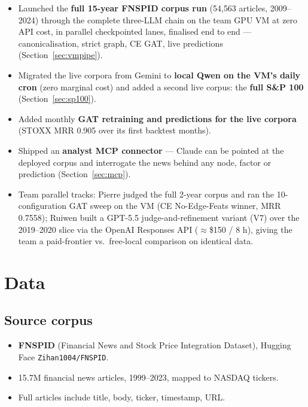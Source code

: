 \documentclass[11pt]{article}
\begin{document}
\begin{itemize}
  \item Launched the \textbf{full 15-year FNSPID corpus run} (54{,}563 articles, 2009--2024) through the complete three-LLM chain on the team GPU VM at zero API cost, in parallel checkpointed lanes, finalised end to end --- canonicalisation, strict graph, CE GAT, live predictions (Section~\ref{sec:vmpipe}).
  \item Migrated the live corpora from Gemini to \textbf{local Qwen on the VM's daily cron} (zero marginal cost) and added a second live corpus: the \textbf{full S\&P 100} (Section~\ref{sec:sp100}).
  \item Added monthly \textbf{GAT retraining and predictions for the live corpora} (STOXX MRR 0.905 over its first backtest months).
  \item Shipped an \textbf{analyst MCP connector} --- Claude can be pointed at the deployed corpus and interrogate the news behind any node, factor or prediction (Section~\ref{sec:mcp}).
  \item Team parallel tracks: Pierre judged the full 2-year corpus and ran the 10-configuration GAT sweep on the VM (CE No-Edge-Feats winner, MRR 0.7558); Ruiwen built a GPT-5.5 judge-and-refinement variant (V7) over the 2019--2020 slice via the OpenAI Responses API (\(\approx\)\$150 / 8 h), giving the team a paid-frontier vs.\ free-local comparison on identical data.
\end{itemize}

\section{Data}

\subsection{Source corpus}
\begin{itemize}
  \item \textbf{FNSPID} (Financial News and Stock Price Integration Dataset), Hugging Face \texttt{Zihan1004/FNSPID}.
  \item 15.7M financial news articles, 1999--2023, mapped to NASDAQ tickers.
  \item Full articles include title, body, ticker, timestamp, URL.
\end{itemize}
\end{document}
